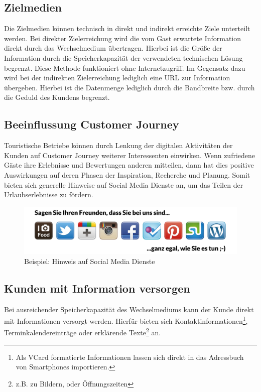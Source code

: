 \subsection{Zielmedien} %
\label{sub:zielmedien}
Die Zielmedien können technisch in direkt und indirekt erreichte Ziele unterteilt werden. Bei direkter Zielerreichung wird die vom Gast erwartete Information direkt durch das Wechselmedium übertragen. Hierbei ist die Größe der Information durch die Speicherkapazität der verwendeten technischen Lösung begrenzt. Diese Methode funktioniert ohne Internetzugriff.  Im Gegensatz dazu wird bei der indirekten Zielerreichung lediglich eine \ac{URL} zur Information übergeben. Hierbei ist die Datenmenge lediglich durch die Bandbreite bzw. durch die Geduld des Kundens begrenzt.

\subsection{Beeinflussung Customer Journey} %
\label{sub:beeinflussung_customer_journey}
Touristische Betriebe können durch Lenkung der digitalen Aktivitäten der Kunden auf Customer Journey weiterer Interessenten einwirken. Wenn zufriedene Gäste ihre Erlebnisse und Bewertungen anderen mitteilen, dann hat dies positive Auswirkungen auf deren Phasen der Inspiration, Recherche und Planung. Somit bieten sich generelle Hinweise auf Social Media Dienste an, um das Teilen der Urlaubserlebnisse zu fördern. 

\begin{figure}[H]
\begin{center}
\includegraphics[width=.8\textwidth]{zielcj.jpg}
\caption[Beispiel: Hinweis auf Social Media Dienste]{Beispiel: Hinweis auf Social Media Dienste\protect\footnotemark}
\label{pic:zielcj}
\end{center}
\end{figure}

\subsection{Kunden mit Information versorgen} %
\label{sub:kunde_mit_information_versorgen}
Bei ausreichender Speicherkapazität des Wechselmediums kann der Kunde direkt mit Informationen versorgt werden. Hierfür bieten sich Kontaktinformationen\footnote{Als VCard formatierte Informationen lassen sich direkt in das Adressbuch von Smartphones importieren.}, Terminkalendereinträge oder erklärende Texte\footnote{z.B. zu Bildern, oder Öffnungszeiten} an.

